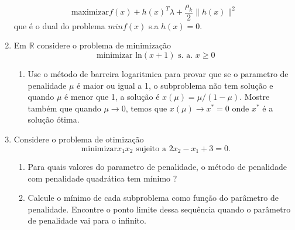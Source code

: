 \documentclass[a4paper,latin]{article}
\begin{document}
\begin{enumerate}
    $$ \text{maximizar} f(x)+h(x)^{T}\lambda+\frac{\rho_k}{2}\|h(x)\|^2$$
    que é o dual do problema $min f(x)$ s.a $h(x)=0$.
    \item Em $\mathbb{R}$ considere o problema de minimização 
    $$ \text{ minimizar }
     \text{ln}(x+1) 
     \text{ s. a. }
      x \geq 0 $$
      \begin{enumerate}
      \item Use o método de barreira logaritmica para provar que se o parametro de penalidade $\mu$ 
      é maior ou igual a 1, o subproblema não tem solução e quando 
      $\mu$ é menor que 1, a solução é 
      $x(\mu)=\mu/(1-\mu)$. 
      Mostre também que quando $\mu \rightarrow 0$, temos que 
      $x(\mu)\rightarrow x^*=0$
      onde $x^*$ é a solução ótima.
      \end{enumerate}
    \item Considere o problema de otimização  
    $$\text{ minimizar} 
    x_1x_2 \text{ sujeito a }
    2x_2-x_1+3=0.$$
    \begin{enumerate}
    \item  Para quais valores do parametro de penalidade, o método de penalidade com penalidade quadrática tem mínimo ?
    \item Calcule o mínimo
    de cada subproblema como função do parâmetro de penalidade. Encontre o ponto limite dessa sequência
 quando o parâmetro de penalidade vai para o infinito. 
    \end{enumerate}         
 \end{enumerate}
\end{document}
